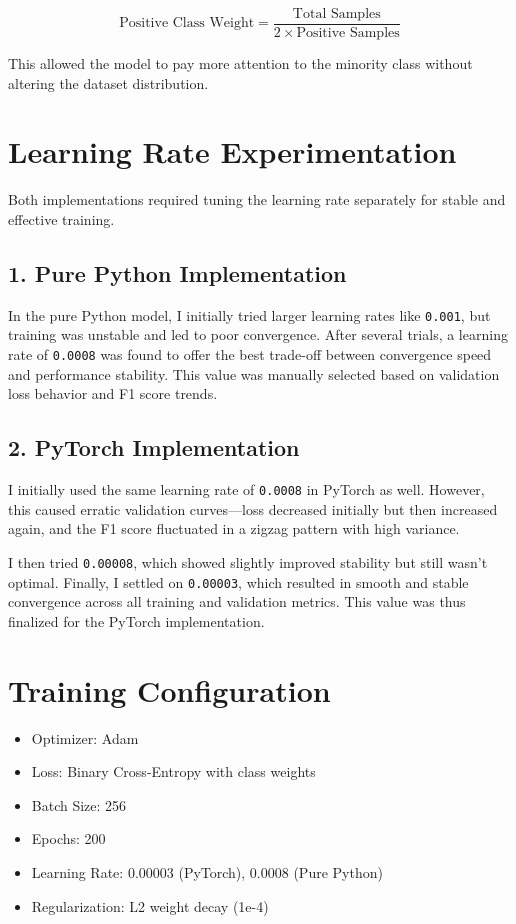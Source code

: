 \documentclass[12pt]{article}
\begin{document}
\[
\text{Positive Class Weight} = \frac{\text{Total Samples}}{2 \times \text{Positive Samples}}
\]

This allowed the model to pay more attention to the minority class without altering the dataset distribution.

\section*{Learning Rate Experimentation}
Both implementations required tuning the learning rate separately for stable and effective training.

\subsection*{1. Pure Python Implementation}
In the pure Python model, I initially tried larger learning rates like \texttt{0.001}, but training was unstable and led to poor convergence. After several trials, a learning rate of \texttt{0.0008} was found to offer the best trade-off between convergence speed and performance stability. This value was manually selected based on validation loss behavior and F1 score trends.

\subsection*{2. PyTorch Implementation}
I initially used the same learning rate of \texttt{0.0008} in PyTorch as well. However, this caused erratic validation curves—loss decreased initially but then increased again, and the F1 score fluctuated in a zigzag pattern with high variance.

I then tried \texttt{0.00008}, which showed slightly improved stability but still wasn’t optimal. Finally, I settled on \texttt{0.00003}, which resulted in smooth and stable convergence across all training and validation metrics. This value was thus finalized for the PyTorch implementation.

\section*{Training Configuration}
\begin{itemize}
    \item Optimizer: Adam
    \item Loss: Binary Cross-Entropy with class weights
    \item Batch Size: 256
    \item Epochs: 200
    \item Learning Rate: 0.00003 (PyTorch), 0.0008 (Pure Python)
    \item Regularization: L2 weight decay (1e-4)
\end{itemize}
\end{document}
